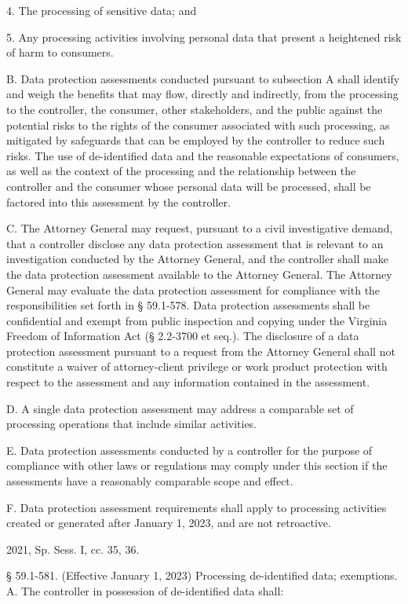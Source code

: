 4. The processing of sensitive data; and

5. Any processing activities involving personal data that present a heightened risk of harm to consumers.

B. Data protection assessments conducted pursuant to subsection A shall identify and weigh the benefits that may flow, directly and indirectly, from the processing to the controller, the consumer, other stakeholders, and the public against the potential risks to the rights of the consumer associated with such processing, as mitigated by safeguards that can be employed by the controller to reduce such risks. The use of de-identified data and the reasonable expectations of consumers, as well as the context of the processing and the relationship between the controller and the consumer whose personal data will be processed, shall be factored into this assessment by the controller.

C. The Attorney General may request, pursuant to a civil investigative demand, that a controller disclose any data protection assessment that is relevant to an investigation conducted by the Attorney General, and the controller shall make the data protection assessment available to the Attorney General. The Attorney General may evaluate the data protection assessment for compliance with the responsibilities set forth in § 59.1-578. Data protection assessments shall be confidential and exempt from public inspection and copying under the Virginia Freedom of Information Act (§ 2.2-3700 et seq.). The disclosure of a data protection assessment pursuant to a request from the Attorney General shall not constitute a waiver of attorney-client privilege or work product protection with respect to the assessment and any information contained in the assessment.

D. A single data protection assessment may address a comparable set of processing operations that include similar activities.

E. Data protection assessments conducted by a controller for the purpose of compliance with other laws or regulations may comply under this section if the assessments have a reasonably comparable scope and effect.

F. Data protection assessment requirements shall apply to processing activities created or generated after January 1, 2023, and are not retroactive.

2021, Sp. Sess. I, cc. 35, 36.

§ 59.1-581. (Effective January 1, 2023) Processing de-identified data; exemptions.
A. The controller in possession of de-identified data shall:

